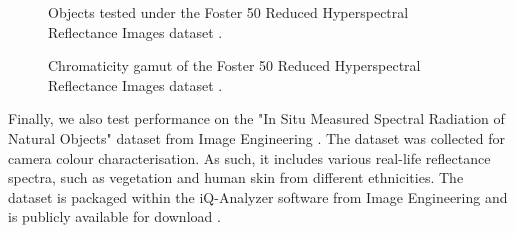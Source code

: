 \begin{figure}
    \centering
    \caption{Objects tested under the Foster 50 Reduced Hyperspectral Reflectance Images dataset \cite{Foster2022}.}
    \label{fig:foster}
\end{figure}

\begin{figure}
    \centering
    \caption{Chromaticity gamut of the Foster 50 Reduced Hyperspectral Reflectance Images dataset \cite{Foster2022}.}
    \label{fig:foster50gamut}
\end{figure}

Finally, we also test performance on the "In Situ Measured Spectral Radiation of Natural Objects" dataset from Image Engineering \cite{wueller2009situ}. The dataset was collected for camera colour characterisation. As such, it includes various real-life reflectance spectra, such as vegetation and human skin from different ethnicities. The dataset is packaged within the iQ-Analyzer software from Image Engineering and is publicly available for download \cite{iqanalyzer}.


